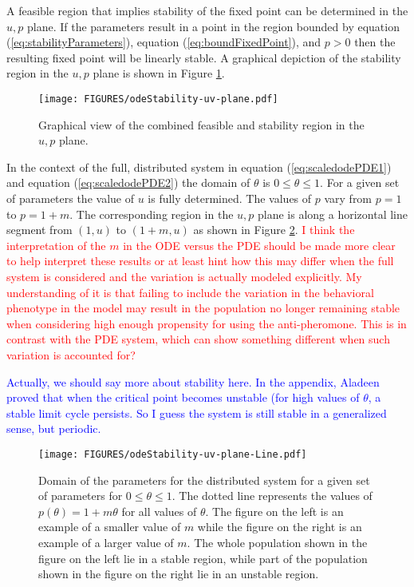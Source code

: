 \documentclass[review]{elsarticle}
\begin{document}
A feasible region that implies stability of the fixed point can be
determined in the $u,p$ plane. If the parameters result in a point in
the region bounded by equation (\ref{eq:stabilityParameters}),
equation (\ref{eq:boundFixedPoint}), and $p>0$ then the resulting
fixed point will be linearly stable. A graphical depiction of the
stability region in the $u,p$ plane is shown in Figure
\ref{fig:uvStabilityRegion}.

\begin{figure}[htb]
  \centering
  \texttt{[image: FIGURES/odeStability-uv-plane.pdf]}
  \caption[Stability region in the $u,p$ plane.]{Graphical view of the
    combined feasible and stability region in the $u,p$ plane.}
  \label{fig:uvStabilityRegion}
\end{figure}

In the context of the full, distributed system in equation
(\ref{eq:scaledodePDE1}) and equation (\ref{eq:scaledodePDE2}) the
domain of $\theta$ is $0\leq\theta\leq 1$. For a given set of
parameters the value of $u$ is fully determined. The values of $p$
vary from $p=1$ to $p=1+m$.  The corresponding region in the $u,p$
plane is along a horizontal line segment from $(1,u)$ to
$(1+m,u)$ as shown in Figure \ref{fig:distributedLineSegment}. \textcolor{red}{ I think the interpretation of the $m$ in the ODE versus the PDE should be made more clear to help interpret these results or at least hint how this may differ when the full system is considered and the variation is actually modeled explicitly. My understanding of it is that failing to include the variation in the behavioral phenotype in the model may result in the population no longer remaining stable when considering high enough propensity for using the anti-pheromone. This is in contrast with the PDE system, which can show something different when such variation is accounted for?}

\textcolor{blue}  {Actually, we should say more about stability here.  In the appendix, Aladeen proved that when the critical point becomes unstable (for high values of $\theta$, a stable limit cycle persists.  So I guess the system is still stable in a generalized sense, but periodic.}

\begin{figure}[htb]
  \centering
  \texttt{[image: FIGURES/odeStability-uv-plane-Line.pdf]}
  \caption[Domain of the distributed system in the $u,p$
  plane.]{Domain of the parameters for the distributed system for a
    given set of parameters for $0\leq\theta\leq 1$. The dotted line
    represents the values of $p(\theta)=1+m\theta$ for all
    values of $\theta$. The figure on the left is an example of a
    smaller value of $m$ while the figure on the right is an example
    of a larger value of $m$. The whole population shown in the figure
    on the left lie in a stable region, while part of the population
    shown in the figure on the right lie in an unstable region.}
  \label{fig:distributedLineSegment}
\end{figure}
\end{document}
